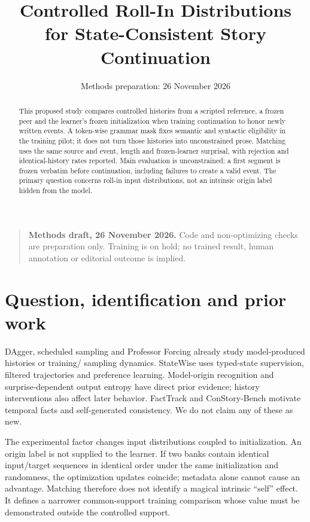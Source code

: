 \documentclass[11pt,a4paper]{article}
\title{Controlled Roll-In Distributions for State-Consistent Story Continuation}
\author{}
\date{Methods preparation: 26 November 2026}
\renewcommand{\projectstatus}{\begin{quote}\small\textbf{Methods draft,
26 November 2026.} Code and non-optimizing checks are preparation only.
Training is on hold; no trained result, human annotation or editorial outcome
is implied.\end{quote}}
\begin{document}
\maketitle\projectstatus
\begin{abstract}
This proposed study compares controlled histories from a scripted reference,
a frozen peer and the learner's frozen initialization when training continuation
to honor newly written events. A token-wise grammar mask fixes semantic and
syntactic eligibility in the training pilot; it does not turn those histories
into unconstrained prose. Matching uses the same source and event, length and
frozen-learner surprisal, with rejection and identical-history rates reported.
Main evaluation is unconstrained: a first segment is frozen verbatim before
continuation, including failures to create a valid event. The primary question
concerns roll-in input distributions, not an intrinsic origin label hidden
from the model.
\end{abstract}

\section{Question, identification and prior work}
DAgger\cite{dagger}, scheduled sampling\cite{scheduled} and Professor
Forcing\cite{professor} already study model-produced histories or training/
sampling dynamics. StateWise uses typed-state supervision, filtered trajectories
and preference learning\cite{statewise}. Model-origin recognition and
surprise-dependent output entropy have direct prior evidence\cite{enaction};
history interventions also affect later behavior\cite{historyeffects}.
FactTrack\cite{facttrack} and ConStory-Bench\cite{constory} motivate temporal
facts and self-generated consistency. We do not claim any of these as new.

The experimental factor changes input distributions coupled to initialization.
An origin label is not supplied to the learner. If two banks contain identical
input/target sequences in identical order under the same initialization and
randomness, the optimization updates coincide; metadata alone cannot cause an
advantage. Matching therefore does not identify a magical intrinsic ``self''
effect. It defines a narrower common-support training comparison whose value
must be demonstrated outside the controlled support.
\end{document}
